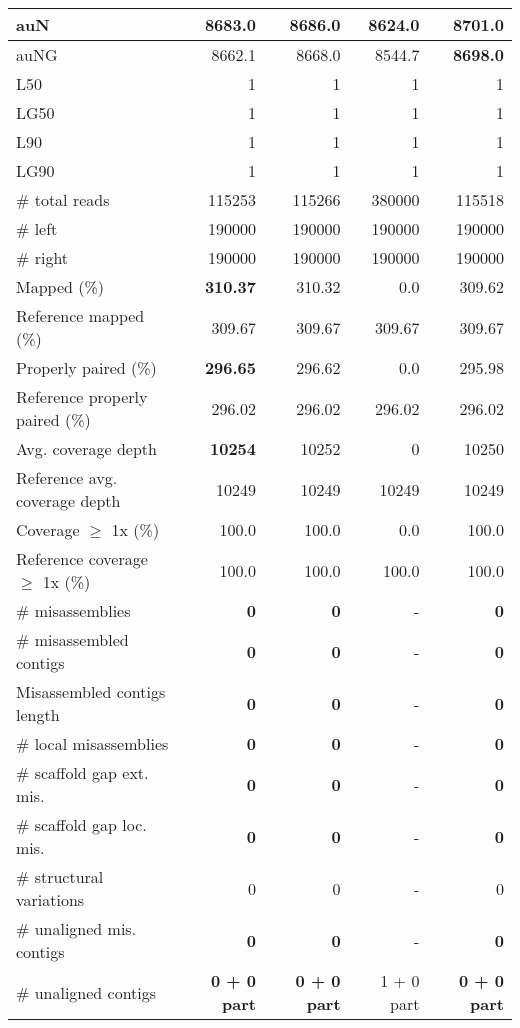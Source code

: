 \documentclass[12pt,a4paper]{article}
\begin{document}
\begin{table}[ht]
\begin{center}
\begin{tabular}{|l*{4}{|r}|}
auN & 8683.0 & 8686.0 & 8624.0 & {\bf 8701.0} \\ \hline
auNG & 8662.1 & 8668.0 & 8544.7 & {\bf 8698.0} \\ \hline
L50 & 1 & 1 & 1 & 1 \\ \hline
LG50 & 1 & 1 & 1 & 1 \\ \hline
L90 & 1 & 1 & 1 & 1 \\ \hline
LG90 & 1 & 1 & 1 & 1 \\ \hline
\# total reads & 115253 & 115266 & 380000 & 115518 \\ \hline
\# left & 190000 & 190000 & 190000 & 190000 \\ \hline
\# right & 190000 & 190000 & 190000 & 190000 \\ \hline
Mapped (\%) & {\bf 310.37} & 310.32 & 0.0 & 309.62 \\ \hline
Reference mapped (\%) & 309.67 & 309.67 & 309.67 & 309.67 \\ \hline
Properly paired (\%) & {\bf 296.65} & 296.62 & 0.0 & 295.98 \\ \hline
Reference properly paired (\%) & 296.02 & 296.02 & 296.02 & 296.02 \\ \hline
Avg. coverage depth & {\bf 10254} & 10252 & 0 & 10250 \\ \hline
Reference avg. coverage depth & 10249 & 10249 & 10249 & 10249 \\ \hline
Coverage $\geq$ 1x (\%) & 100.0 & 100.0 & 0.0 & 100.0 \\ \hline
Reference coverage $\geq$ 1x (\%) & 100.0 & 100.0 & 100.0 & 100.0 \\ \hline
\# misassemblies & {\bf 0} & {\bf 0} & - & {\bf 0} \\ \hline
\# misassembled contigs & {\bf 0} & {\bf 0} & - & {\bf 0} \\ \hline
Misassembled contigs length & {\bf 0} & {\bf 0} & - & {\bf 0} \\ \hline
\# local misassemblies & {\bf 0} & {\bf 0} & - & {\bf 0} \\ \hline
\# scaffold gap ext. mis. & {\bf 0} & {\bf 0} & - & {\bf 0} \\ \hline
\# scaffold gap loc. mis. & {\bf 0} & {\bf 0} & - & {\bf 0} \\ \hline
\# structural variations & 0 & 0 & - & 0 \\ \hline
\# unaligned mis. contigs & {\bf 0} & {\bf 0} & - & {\bf 0} \\ \hline
\# unaligned contigs & {\bf 0 + 0 part} & {\bf 0 + 0 part} & 1 + 0 part & {\bf 0 + 0 part} \\ \hline

\end{tabular}
\end{center}
\end{table}
\end{document}
